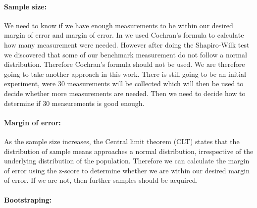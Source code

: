 \paragraph{Sample size:}
We need to know if we have enough measurements to be within our desired margin of error and margin of error. In \cite{biksbois} we used Cochran's formula to calculate how many measurement were needed. However after doing the Shapiro-Wilk test we discovered that some of our benchmark measurement do not follow a normal distribution. Therefore Cochran's formula should not be used. We are therefore going to take another approach in this work. There is still going to be an initial experiment, were 30 measurements will be collected which will then be used to decide whether more measurements are needed. Then we need to decide how to determine if 30 measurements is good enough.

\paragraph{Margin of error:} As the sample size increases, the Central limit theorem (CLT) states that the distribution of sample means approaches a normal distribution, irrespective of the underlying distribution of the population. Therefore we can calculate the margin of error using the z-score to determine whether we are within our desired margin of error. If we are not, then further samples should be acquired.

\paragraph{Bootstraping:}